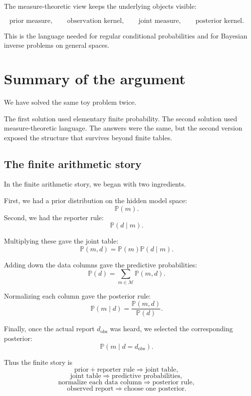 \documentclass[11pt]{article}
\newcommand{\M}{\mathcal{M}}
\newcommand{\dobs}{d_{\mathrm{obs}}}
\begin{document}
The measure-theoretic view keeps the underlying objects visible:

\[
    \text{prior measure},
    \qquad
    \text{observation kernel},
    \qquad
    \text{joint measure},
    \qquad
    \text{posterior kernel}.
\]

This is the language needed for regular conditional probabilities and for Bayesian inverse problems on general spaces.

\section{Summary of the argument}
\label{sec:summary}

We have solved the same toy problem twice.

The first solution used elementary finite probability. The second solution used measure-theoretic language. The answers were the same, but the second version exposed the structure that survives beyond finite tables.

\subsection{The finite arithmetic story}

In the finite arithmetic story, we began with two ingredients.

First, we had a prior distribution on the hidden model space:
\[
    \mathbb{P}(m).
\]
Second, we had the reporter rule:
\[
    \mathbb{P}(d\mid m).
\]

Multiplying these gave the joint table:
\[
    \mathbb{P}(m,d)
    =
    \mathbb{P}(m)\mathbb{P}(d\mid m).
\]

Adding down the data columns gave the predictive probabilities:
\[
    \mathbb{P}(d)
    =
    \sum_{m\in\M}\mathbb{P}(m,d).
\]

Normalizing each column gave the posterior rule:
\[
    \mathbb{P}(m\mid d)
    =
    \frac{\mathbb{P}(m,d)}{\mathbb{P}(d)}.
\]

Finally, once the actual report \(\dobs\) was heard, we selected the corresponding posterior:
\[
    \mathbb{P}(m\mid d=\dobs).
\]

Thus the finite story is
\[
    \text{prior}
    +
    \text{reporter rule}
    \Longrightarrow
    \text{joint table},
\]
\[
    \text{joint table}
    \Longrightarrow
    \text{predictive probabilities},
\]
\[
    \text{normalize each data column}
    \Longrightarrow
    \text{posterior rule},
\]
\[
    \text{observed report}
    \Longrightarrow
    \text{choose one posterior}.
\]
\end{document}
